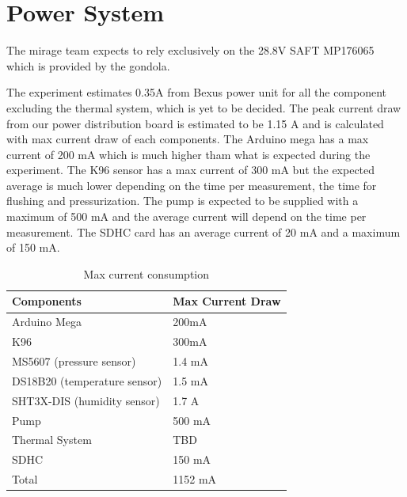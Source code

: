 \documentclass[12pt,a4paper]{report}
\newcommand{\micro}{\textmu}
\begin{document}
\section{Power System}
The \ac{mirage} team expects to rely exclusively on the 28.8V SAFT MP176065 which is provided by the gondola.

The experiment estimates 0.35A from Bexus power unit for all the component excluding the thermal system, which is yet to be decided. The peak current draw from our power distribution board is estimated to be 1.15 A and is calculated with max current draw of each components. The Arduino mega has a max current of 200 mA which is much higher tham what is expected during the experiment. The K96 sensor has a max current of 300 mA but the expected average is much lower depending on the time per measurement, the time for flushing and pressurization. The pump is expected to be supplied with a maximum of 500 mA and the average current will depend on the time per measurement. The SDHC card has an average current of 20 mA and a maximum of 150 mA.

\begin{table}[H]
\centering
\caption{Max current consumption}
\label{tab:current_consumption}
\begin{tabular}{ll}
\toprule
\textbf{Components} & \textbf{Max Current Draw} \\
\midrule
Arduino Mega & 200mA \\
K96 & 300mA \\
MS5607 (pressure sensor) & 1.4 mA \\
DS18B20 (temperature sensor) & 1.5 mA \\
SHT3X-DIS (humidity sensor) & 1.7 \micro A \\
Pump & 500 mA \\
Thermal System & TBD \\
SDHC & 150 mA \\
\midrule
Total & 1152 mA \\
\bottomrule
\end{tabular}
\end{table}
\end{document}
